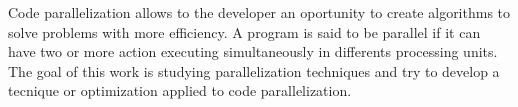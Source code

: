 \begin{Abstract}
        Code parallelization allows to the developer an oportunity to create algorithms to solve problems with more efficiency.
        A program is said to be parallel if it can have two or more action executing simultaneously in differents processing units.
        The goal of this work is studying parallelization techniques and try to develop a tecnique or optimization applied to code parallelization.
\end{Abstract}

